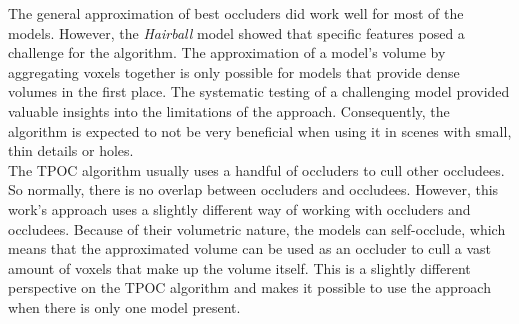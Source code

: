 \noindent
The general approximation of best occluders did work well for most of the models. However, the \emph{Hairball} model showed that specific 
features posed a challenge for the algorithm. The approximation of a model's volume by aggregating voxels together is only possible for 
models that provide dense volumes in the first place. The systematic testing of a challenging model provided valuable insights into the 
limitations of the approach. Consequently, the algorithm is expected to not be very beneficial when using it in scenes with small, thin 
details or holes.\\





\noindent
The \ac{TPOC} algorithm usually uses a handful of occluders to cull other occludees. So normally, there is no overlap between occluders and 
occludees. However, this work's approach uses a slightly different way of working with occluders and occludees. Because of their volumetric 
nature, the models can self-occlude, which means that the approximated volume can be used as an occluder to cull a vast amount of voxels that 
make up the volume itself. This is a slightly different perspective on the \ac{TPOC} algorithm and makes it possible to use the approach when 
there is only one model present. \\

